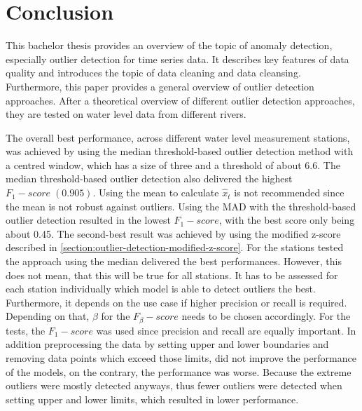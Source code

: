 \chapter{Conclusion}
This bachelor thesis provides an overview of the topic of anomaly detection, especially outlier detection for time series data. It describes key features of data quality and introduces the topic of data cleaning and data cleansing. Furthermore, this paper provides a general overview of outlier detection approaches. After a theoretical overview of different outlier detection approaches, they are tested on water level data from different rivers.
\par
The overall best performance, across different water level measurement stations, was achieved by using the median threshold-based outlier detection method with a centred window, which has a size of three and a threshold of about 6.6. The median threshold-based outlier detection also delivered the highest $F_1-score\;(0.905)$. Using the mean to calculate $\hat{x}_t$ is not recommended since the mean is not robust against outliers. Using the \ac{MAD} with the threshold-based outlier detection resulted in the lowest $F_1-score$, with the best score only being about 0.45. The second-best result was achieved by using the modified z-score described in \autoref{section:outlier-detection-modified-z-score}. For the stations tested the approach using the median delivered the best performances. However, this does not mean, that this will be true for all stations. It has to be assessed for each station individually which model is able to detect outliers the best. Furthermore, it depends on the use case if higher precision or recall is required. Depending on that, $\beta$ for the $F_{\beta}-score$ needs to be chosen accordingly. For the tests, the $F_1-score$ was used since precision and recall are equally important. In addition preprocessing the data by setting upper and lower boundaries and removing data points which exceed those limits, did not improve the performance of the models, on the contrary, the performance was worse. Because the extreme outliers were mostly detected anyways, thus fewer outliers were detected when setting upper and lower limits, which resulted in lower performance.

